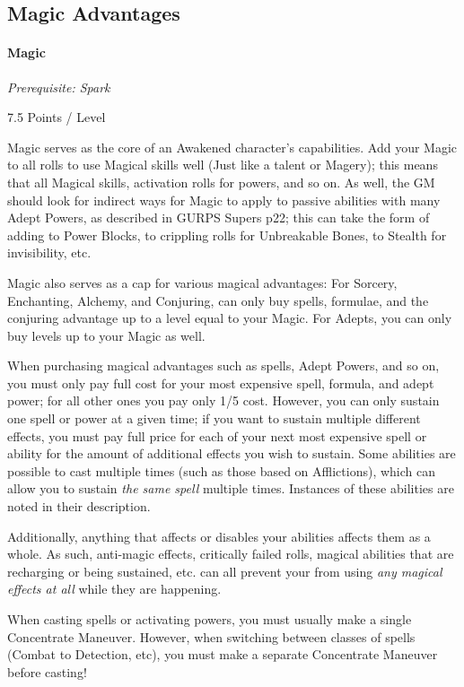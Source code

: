 \begin{multicols*}{3}
	\subsection{Magic Advantages}
	
	\paragraph{Magic}\label{magic}
	\textit{Prerequisite: Spark}
	\begin{flushright}
		7.5 Points / Level
	\end{flushright}
	
	Magic serves as the core of an Awakened character's capabilities. Add your Magic to all rolls to use Magical skills well (Just like a talent or Magery); this means that all Magical skills, activation rolls for powers, and so on. As well, the GM should look for indirect ways for Magic to apply to passive abilities with many Adept Powers, as described in GURPS Supers p22; this can take the form of adding to Power Blocks, to crippling rolls for Unbreakable Bones, to Stealth for invisibility, etc. 
	
	Magic also serves as a cap for various magical advantages: For Sorcery, Enchanting, Alchemy, and Conjuring, can only buy spells, formulae, and the conjuring advantage up to a level equal to your Magic. For Adepts, you can only buy levels up to your Magic as well.
	
	When purchasing magical advantages such as spells, Adept Powers, and so on, you must only pay full cost for your most expensive spell, formula, and adept power; for all other ones you pay only 1/5 cost. However, you can only sustain one spell or power at a given time; if you want to sustain multiple different effects, you must pay full price for each of your next most expensive spell or ability for the amount of additional effects you wish to sustain. Some abilities are possible to cast multiple times (such as those based on Afflictions), which can allow you to sustain \textit{the same spell} multiple times. Instances of these abilities are noted in their description.
	
	Additionally, anything that affects or disables your abilities affects them as a whole. As such, anti-magic effects, critically failed rolls, magical abilities that are recharging or being sustained, etc. can all prevent your from using \textit{any magical effects at all} while they are happening.
	
	When casting spells or activating powers, you must usually make a single Concentrate Maneuver. However, when switching between classes of spells (Combat to Detection, etc), you must make a separate Concentrate Maneuver before casting!
	

\end{multicols*}
